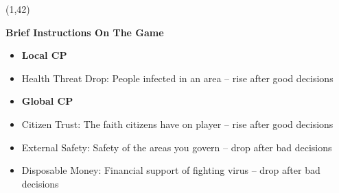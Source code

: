 \documentclass[hyperref={pdfpagelabels=false}]{beamer}
\begin{document}
\begin{frame}
\begin{textblock}{40}
\begin{blankbox}
		\end{blankbox}
	\end{textblock}





\begin{textblock}{35}(1,42)
		\begin{blankbox}
		\huge \textbf{ Brief Instructions On The Game} 
						\begin{itemize}
							\item \textbf {Local CP}
							\item Health Threat Drop: People infected in an area -- rise after good decisions
							\item \textbf {Global CP}
							\item Citizen Trust: The faith citizens have on player -- rise after good decisions
							\item External Safety: Safety of the areas you govern -- drop after bad decisions
							\item Disposable Money: Financial support of fighting virus -- drop after bad decisions
						\end{itemize}
			
		\end{blankbox}
	\end{textblock}



\end{frame}
\end{document}

